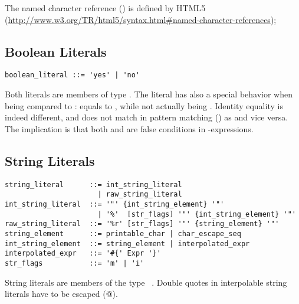 The named character reference () is defined by HTML5 (\url{http://www.w3.org/TR/html5/syntax.html#named-character-references});






\subsection{Boolean Literals}
\label{sec:booleanliterals}

\syntax\begin{lstlisting}
boolean_literal ::= 'yes' | 'no'
\end{lstlisting}

Both literals are members of type \lstinline@Boolean@. The \lstinline@no@ literal has also a special behavior when being compared to \lstinline@nil@: \lstinline@no@ equals to \lstinline@nil@, while not actually being \lstinline@nil@. Identity equality is indeed different, and  does not match in pattern matching () as  and vice versa. The implication is that both \lstinline@nil@ and \lstinline@no@ are false conditions in \lstinline@if@-expressions. 





\subsection{String Literals}
\label{sec:stringliterals}

\syntax\begin{lstlisting}
string_literal      ::= int_string_literal
                      | raw_string_literal
int_string_literal  ::= '"' {int_string_element} '"'
                      | '%'  [str_flags] '"' {int_string_element} '"'
raw_string_literal  ::= '%r' [str_flags] '"' {string_element} '"'
string_element      ::= printable_char | char_escape_seq
int_string_element  ::= string_element | interpolated_expr
interpolated_expr   ::= '#{' Expr '}'
str_flags           ::= 'm' | 'i'
\end{lstlisting}

String literals are members of the type ~\lstinline@String@. Double quotes in interpolable string literals have to be escaped (\lstinline@\"@).

